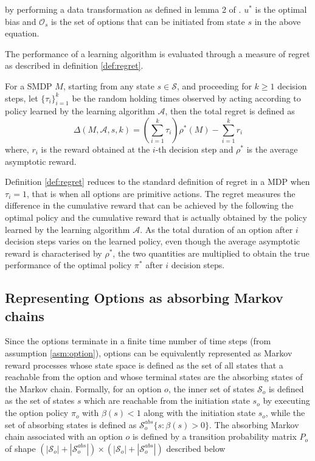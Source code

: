 by performing a data transformation as defined in lemma 2 of \cite{federgruen_denumerable_1983}. $u^*$ is the optimal bias and $\mathcal{O}_s$ is the set of options that can be initiated from state $s$ in the above equation.

The performance of a learning algorithm is evaluated through a measure of regret as described in definition \ref{def:regret}.

\begin{definition}
\label{def:regret}
For a SMDP $M$, starting from any state $s \in \mathcal{S}$, and proceeding for $k \ge 1$ decision steps, let $\{\tau_i\}_{i=1}^k$ be the random holding times observed by acting according to policy learned by the learning algorithm $\mathcal{A}$, then the total regret is defined as
\begin{equation}
    \Delta(M, \mathcal{A}, s, k) = \left( \sum_{i=1}^k \tau_i \right) \rho^*(M) - \sum_{i=1}^k r_i
\end{equation}
where, $r_i$ is the reward obtained at the $i$-th decision step and $\rho^*$ is the average asymptotic reward.
\end{definition}

Definition \ref{def:regret} reduces to the standard definition of regret in a MDP when $\tau_i = 1$, that is when all options are primitive actions.
The regret measures the difference in the cumulative reward that can be achieved by the following the optimal policy and the cumulative reward that is actually obtained by the policy learned by the learning algorithm $\mathcal{A}$.
As the total duration of an option after $i$ decision steps varies on the learned policy, even though the average asymptotic reward is characterised by $\rho^*$, the two quantities are multiplied to obtain the true performance of the optimal policy $\pi^*$ after $i$ decision steps.

\subsection{Representing Options as absorbing Markov chains} \label{sec:trueP0}

Since the options terminate in a finite time number of time steps (from assumption \ref{asm:option}), options can be equivalently represented as Markov reward processes whose state space is defined as the set of all states that a reachable from the option and whose terminal states are the absorbing states of the Markov chain.
Formally, for an option $o$, the inner set of states $\mathcal{S}_o$ is defined as the set of states $s$ which are reachable from the initiation state $s_o$ by executing the option policy $\pi_o$ with $\beta(s) < 1$ along with the initiation state $s_o$, while the set of absorbing states is defined as $\mathcal{S}_o^{abs}\{s : \beta(s) > 0\}$.
The absorbing Markov chain associated with an option $o$ is defined by a transition probability matrix $P_o$ of shape $(|\mathcal{S}_o| + |\mathcal{S}_o^{abs}|) \times (|\mathcal{S}_o| + |\mathcal{S}_o^{abs}|)$ described below

